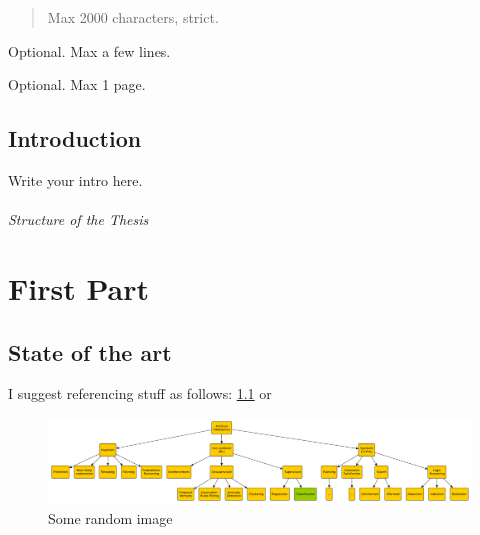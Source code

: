 \documentclass[12pt,a4paper,openright,twoside]{book}
\begin{document}
	
\frontmatter


\begin{abstract}	
Max 2000 characters, strict.
\end{abstract}

\begin{dedication} %
Optional. Max a few lines.
\end{dedication}

\begin{acknowledgements} %
Optional. Max 1 page.
\end{acknowledgements}

\tableofcontents   
\listoffigures     %
\lstlistoflistings %

\mainmatter

\chapter{Introduction}
\label{chap:introduction}

Write your intro here.

\paragraph{Structure of the Thesis}


\part{First Part}

\chapter{State of the art}

I suggest referencing stuff as follows: \cref{fig:random-image} or 

\begin{figure}
    \centering
    \includegraphics[width=.8\linewidth]{figures/random-image.pdf}
    \caption{Some random image}
    \label{fig:random-image}
\end{figure}
\end{document}

